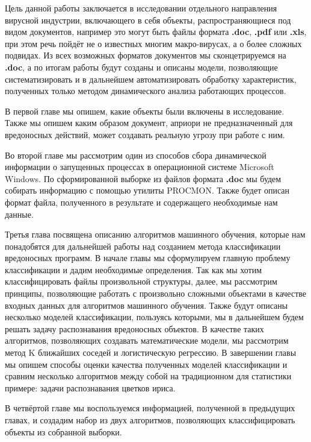 Цель данной работы заключается в исследовании отдельного направления вирусной индустрии, включающего в себя объекты, распространяющиеся под видом документов, например это могут быть файлы формата \textbf{.doc}, \textbf{.pdf} или \textbf{.xls}, при этом речь пойдёт не о известных многим макро-вирусах, а о более сложных подвидах.
Из всех возможных форматов документов мы сконцетрируемся на \textbf{.doc}, а по итогам работы будут созданы и описаны модели, позволяющие систематизировать и в дальнейшем автоматизировать обработку характеристик, полученных только методом динамического анализа работающих процессов.

В первой главе мы опишем, какие объекты были включены в исследование.
Также мы опишем каким образом документ, априори не предназначенный для вредоносных действий, может создавать реальную угрозу при работе с ним.

Во второй главе мы рассмотрим один из способов сбора динамической информации о запущенных процессах в операционной системе Microsoft Windows. 
По сформированной выборке из файлов формата \textbf{.doc} мы будем собирать информацию с помощью утилиты PROCMON.
Также будет описан формат файла, полученного в результате и содержащего необходимые нам данные.

Третья глава посвящена описанию алгоритмов машинного обучения, которые нам понадобятся для дальнейшей работы над созданием метода классификации вредоносных программ.
В начале главы мы сформулируем главную проблему классификации и дадим необходимые определения.
Так как мы хотим классифицировать файлы произвольной структуры, далее, мы рассмотрим принципы, позволяющие работать с произвольно сложными объектами в качестве входных данных для алгоритмов машинного обучения.
Также будут описаны несколько моделей классификации, пользуясь которыми, мы в дальнейшем будем решать задачу распознавания вредоносных объектов.
В качестве таких алгоритмов, позволяющих создавать математические модели, мы рассмотрим метод K ближайших соседей и логистическую регрессию.
В завершении главы мы опишем способы оценки качества полученных моделей классификации и сравним несколько алгоритмов между собой на традиционном для статистики примере: задачи распознавания цветков ириса.

В четвёртой главе мы воспользуемся информацией, полученной в предыдущих главах, и создадим набор из двух алгоритмов, позволяющих классифицировать объекты из собранной выборки.

